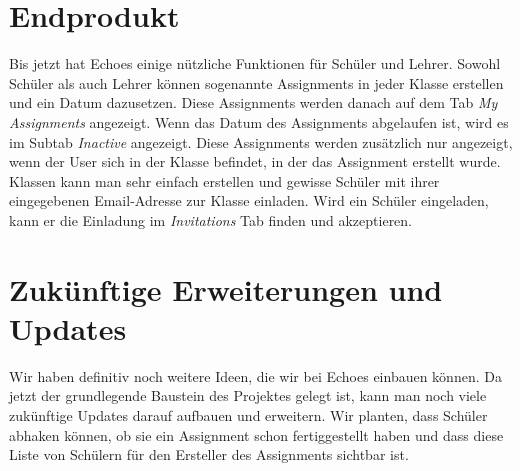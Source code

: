 \documentclass[a4paper, titlepage]{article}
\begin{document}
    \section{Endprodukt}
    Bis jetzt hat Echoes einige nützliche Funktionen für Schüler und Lehrer. Sowohl Schüler als auch Lehrer können sogenannte Assignments 
    in jeder Klasse erstellen und ein Datum dazusetzen. Diese Assignments werden danach auf dem Tab \emph{My Assignments} angezeigt. 
    Wenn das Datum des Assignments abgelaufen ist, wird es im Subtab \emph{Inactive} angezeigt. Diese Assignments werden zusätzlich nur angezeigt, 
    wenn der User sich in der Klasse befindet, in der das Assignment erstellt wurde. Klassen kann man sehr einfach erstellen und gewisse Schüler 
    mit ihrer eingegebenen Email-Adresse zur Klasse einladen. Wird ein Schüler eingeladen, kann er die Einladung im \emph{Invitations} Tab 
    finden und akzeptieren.
    
    \section{Zukünftige Erweiterungen und Updates}
    Wir haben definitiv noch weitere Ideen, die wir bei Echoes einbauen können. Da jetzt der grundlegende Baustein des Projektes gelegt ist, kann man noch viele zukünftige Updates darauf aufbauen und erweitern. Wir planten, dass Schüler abhaken können, ob sie ein Assignment schon fertiggestellt haben und dass diese Liste von Schülern für den Ersteller des Assignments sichtbar ist.
    

    \newpage
  
\end{document}
